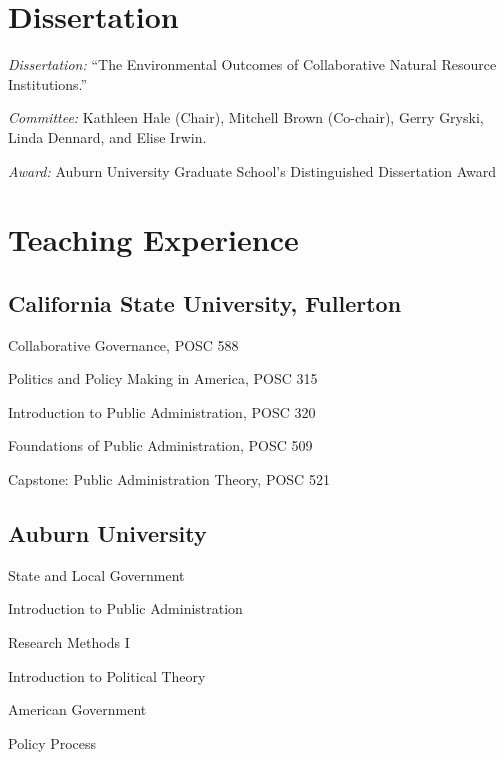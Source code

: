 \documentclass[12pt,letterpaper]{article}
\renewenvironment{itemize}{
  \begin{list}{}{
    \setlength{\leftmargin}{1.5em}
    \setlength{\itemsep}{0.25em}
    \setlength{\parskip}{0pt}
    \setlength{\parsep}{0.25em}
  }
}{
  \end{list}
}
\begin{document}
	


\section*{Dissertation}
    \begin{itemize}\leftmargin=2pt\itemindent=-15pt\leftmargin=2pt\itemindent=-15pt
        \item \emph{Dissertation:} ``The Environmental Outcomes of Collaborative Natural Resource Institutions.'' 
        \item \emph{Committee:} Kathleen Hale (Chair), Mitchell Brown (Co-chair),
        Gerry Gryski, \\Linda Dennard, and Elise Irwin.
        \item \emph{Award:} Auburn University Graduate School's Distinguished Dissertation Award
    \end{itemize}
		
\section*{Teaching Experience}
\leftmargin=2pt\itemindent=-15pt\leftmargin=2pt\itemindent=-15pt
	
\subsection*{California State University, Fullerton}
	\begin{itemize}\leftmargin=2pt\itemindent=-15pt
		\item Collaborative Governance, POSC 588
		\item Politics and Policy Making in America, POSC 315
		\item Introduction to Public Administration, POSC 320
		\item Foundations of Public Administration, POSC 509
		\item Capstone: Public Administration Theory, POSC 521
	\end{itemize}
	
\subsection*{Auburn University}
	\begin{itemize}\leftmargin=2pt\itemindent=-15pt
		\item State and Local Government
		\item Introduction to Public Administration
        \item Research Methods I
        \item Introduction to Political Theory
        \item American Government
        \item Policy Process	
	\end{itemize}
	
\end{document}
